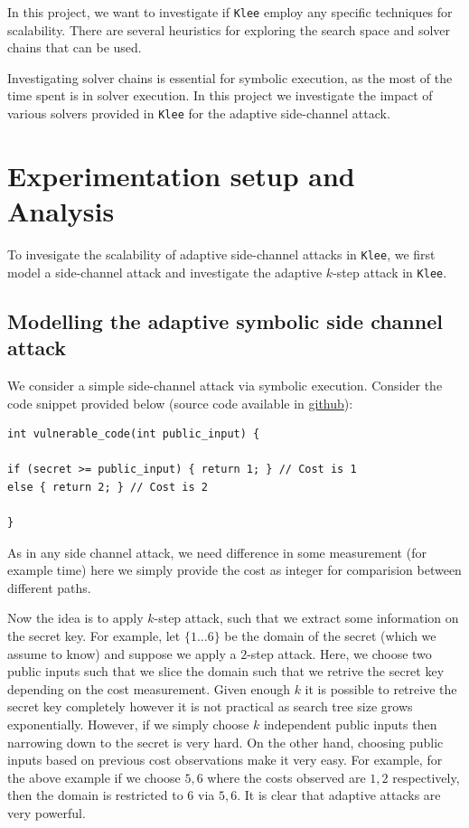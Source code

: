\documentclass[11pt,a4paper,notitlepage]{article}
\begin{document}
In this project, we want to investigate if \texttt{Klee} employ any specific techniques for scalability.
There are several heuristics for exploring the search space and solver chains that can be used.

Investigating solver chains is essential for symbolic execution, as the most of the time spent is in solver execution.
In this project we investigate the impact of various solvers provided in \texttt{Klee} for the adaptive side-channel attack. 

\section{Experimentation setup and Analysis}
\label{sec:experimentationanddesign}

To invesigate the scalability of adaptive side-channel attacks in \texttt{Klee}, we first model a side-channel attack and investigate the adaptive $k$-step attack in \texttt{Klee}.

\subsection{Modelling the adaptive symbolic side channel attack}
\label{subsec:modellingsscattack}

We consider a simple side-channel attack via symbolic execution.
Consider the code snippet provided below (source code available in \href{https://github.com/irfansha/LBS_projects.git}{github}):
\begin{verbatim}
int vulnerable_code(int public_input) {

if (secret >= public_input) { return 1; } // Cost is 1
else { return 2; } // Cost is 2

}
\end{verbatim}

As in any side channel attack, we need difference in some measurement (for example time) here we simply provide the cost as integer for comparision between different paths.

Now the idea is to apply $k$-step attack, such that we extract some information on the secret key.
For example, let $\{1 \dots 6\}$ be the domain of the secret (which we assume to know) and suppose we apply a $2$-step attack.
Here, we choose two public inputs such that we slice the domain such that we retrive the secret key depending on the cost measurement.
Given enough $k$ it is possible to retreive the secret key completely however it is not practical as search tree size grows exponentially.
However, if we simply choose $k$ independent public inputs then narrowing down to the secret is very hard.
On the other hand, choosing public inputs based on previous cost observations make it very easy.
For example, for the above example if we choose ${5,6}$ where the costs observed are ${1,2}$ respectively, then the domain is restricted to ${6}$ via ${5,6}$. It is clear that adaptive attacks are very powerful.
\end{document}
